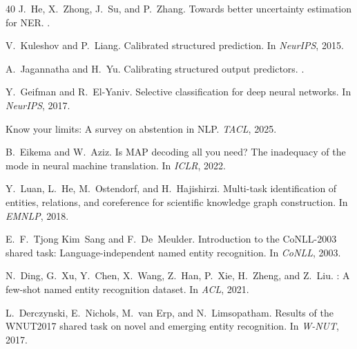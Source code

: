 \documentclass[11pt,a4paper]{article}
\begin{document}
\begin{thebibliography}{40}
J.~He, X.~Zhong, J.~Su, and P.~Zhang.
\newblock Towards better uncertainty estimation for {NER}.
.

V.~Kuleshov and P.~Liang.
\newblock Calibrated structured prediction.
\newblock In \emph{NeurIPS}, 2015.

A.~Jagannatha and H.~Yu.
\newblock Calibrating structured output predictors.
.

Y.~Geifman and R.~El-Yaniv.
\newblock Selective classification for deep neural networks.
\newblock In \emph{NeurIPS}, 2017.

Know your limits: A survey on abstention in {NLP}.
\newblock \emph{TACL}, 2025.

B.~Eikema and W.~Aziz.
\newblock Is {MAP} decoding all you need? {The} inadequacy of the mode in neural machine translation.
\newblock In \emph{ICLR}, 2022.

Y.~Luan, L.~He, M.~Ostendorf, and H.~Hajishirzi.
\newblock Multi-task identification of entities, relations, and coreference for scientific knowledge graph construction.
\newblock In \emph{EMNLP}, 2018.

E.~F.~Tjong Kim~Sang and F.~De~Meulder.
\newblock Introduction to the {CoNLL}-2003 shared task: Language-independent named entity recognition.
\newblock In \emph{CoNLL}, 2003.

N.~Ding, G.~Xu, Y.~Chen, X.~Wang, Z.~Han, P.~Xie, H.~Zheng, and Z.~Liu.
: A few-shot named entity recognition dataset.
\newblock In \emph{ACL}, 2021.

L.~Derczynski, E.~Nichols, M.~van Erp, and N.~Limsopatham.
\newblock Results of the {WNUT}2017 shared task on novel and emerging entity recognition.
\newblock In \emph{W-NUT}, 2017.

\end{thebibliography}
\endgroup

\appendix
\end{document}

